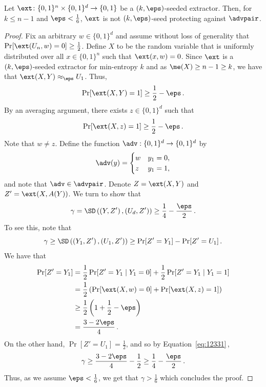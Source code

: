 \begin{claim}\label{c:lower bound image two intro}
	Let $\ext \colon \{0,1\}^n \times \{0,1\}^d \to \{0,1\}$ be a $(k,\eps)$-seeded extractor. Then, for $k \le n-1$ and $\eps < \frac1{6}$, $\ext$ is not $(k,\eps)$-seed protecting against $\advpair$.
\end{claim}
\begin{proof}
	Fix an arbitrary $w \in \{0,1\}^d$ and assume without loss of generality that $\Pr[\ext(U_n,w) = 0] \ge \frac1{2}$. Define $X$ to be the random variable that is uniformly distributed over all $x \in \{0,1\}^n$ such that $\ext(x,w ) = 0$. Since $\ext$ is a 
%
$(k,\eps)$-seeded extractor   %
for min-entropy $k$ and as $\me(X) \ge n-1 \ge k$, we have that $\ext(X,Y) \approx_\eps U_1$. Thus,
	$$
	\Pr[\ext(X,Y) = 1] \ge \frac1{2} - \eps\,.
	$$
	By an averaging argument, there exists $z \in \{0,1\}^d$ such that
	$$
	\Pr[\ext(X,z) = 1] \ge \frac1{2} - \eps\,.
	$$
	Note that $w \neq z$. Define the function $\adv : \{0,1\}^d \to \{0,1\}^d$ by
	\begin{align*}
	\adv(y) = \begin{cases}
	w & y_1 = 0,\\
	z & y_1 = 1,
	\end{cases}
	\end{align*}
	and note that $\adv \in \advpair$. Denote $Z = \ext(X,Y)$ and $Z' = \ext(X,A(Y))$.	We turn to show that
	$$
	\gamma = \SD\left(\left(Y,Z'\right) , \left(U_d, Z'\right)\right) \ge \frac1{4} - \frac{\eps}{2}\,.
	$$
	To see this, note that
	\begin{equation}\label{eq:12331}
	\gamma \ge \SD\left(\left(Y_1, Z'\right) , \left(U_1,Z'\right)\right)
	\ge \Pr[Z' = Y_1] - \Pr[Z' = U_1]\,.
	\end{equation}
	We have that
	\begin{align*}
	\Pr[Z' = Y_1] &=
	\frac1{2} \Pr[Z' = Y_1 \mid Y_1 = 0] + \frac1{2} \Pr[Z' = Y_1 \mid Y_1 = 1] \\
	&= \frac1{2} \left(\Pr[\ext(X,w) = 0] + \Pr[\ext(X,z) = 1] \right) \\
	&\ge \frac1{2} \left(1 + \frac1{2} - \eps\right) \\
	&= \frac{3-2\eps}{4}\,.
	\end{align*}
	On the other hand, $\Pr[Z' = U_1] = \frac1{2}$, and so by Equation~\eqref{eq:12331}\,, $$
	\gamma \ge \frac{3-2\eps}{4} - \frac1{2} \ge \frac1{4} - \frac{\eps}{2}\,.
	$$
	Thus, as we assume $\eps < \frac1{6}$, we get that
	$\gamma > \frac1{6}$ which concludes the proof.
\end{proof}

